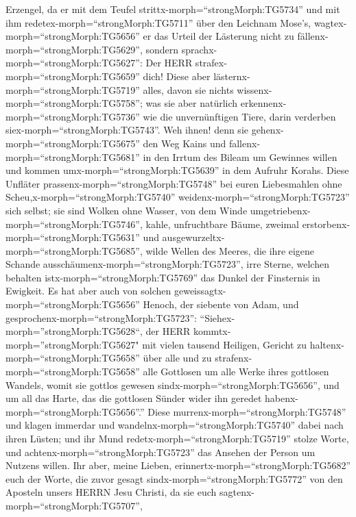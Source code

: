 Erzengel, da er mit dem Teufel strittx-morph=``strongMorph:TG5734'' und
mit ihm redetex-morph=``strongMorph:TG5711'' über den Leichnam Mose's,
wagtex-morph=``strongMorph:TG5656'' er das Urteil der Lästerung nicht zu
fällenx-morph=``strongMorph:TG5629'', sondern
sprachx-morph=``strongMorph:TG5627'': Der HERR
strafex-morph=``strongMorph:TG5659'' dich!  Diese aber
lästernx-morph=``strongMorph:TG5719'' alles, davon sie nichts
wissenx-morph=``strongMorph:TG5758''; was sie aber natürlich
erkennenx-morph=``strongMorph:TG5736'' wie die unvernünftigen Tiere,
darin verderben siex-morph=``strongMorph:TG5743''.  Weh
ihnen! denn sie gehenx-morph=``strongMorph:TG5675'' den Weg Kains und
fallenx-morph=``strongMorph:TG5681'' in den Irrtum des Bileam um
Gewinnes willen und kommen umx-morph=``strongMorph:TG5639'' in dem
Aufruhr Korahs.  Diese Unfläter
prassenx-morph=``strongMorph:TG5748'' bei euren Liebesmahlen ohne
Scheu,x-morph=``strongMorph:TG5740''
weidenx-morph=``strongMorph:TG5723'' sich selbst; sie sind Wolken ohne
Wasser, von dem Winde umgetriebenx-morph=``strongMorph:TG5746'', kahle,
unfruchtbare Bäume, zweimal erstorbenx-morph=``strongMorph:TG5631'' und
ausgewurzeltx-morph=``strongMorph:TG5685'',  wilde Wellen
des Meeres, die ihre eigene Schande
ausschäumenx-morph=``strongMorph:TG5723'', irre Sterne, welchen behalten
istx-morph=``strongMorph:TG5769'' das Dunkel der Finsternis in Ewigkeit.
 Es hat aber auch von solchen
geweissagtx-morph=``strongMorph:TG5656'' Henoch, der siebente von Adam,
und gesprochenx-morph=``strongMorph:TG5723'':
``Siehex-morph=''strongMorph:TG5628``, der HERR
kommtx-morph=''strongMorph:TG5627" mit vielen tausend Heiligen,
 Gericht zu haltenx-morph=``strongMorph:TG5658'' über alle
und zu strafenx-morph=``strongMorph:TG5658'' alle Gottlosen um alle
Werke ihres gottlosen Wandels, womit sie gottlos gewesen
sindx-morph=``strongMorph:TG5656'', und um all das Harte, das die
gottlosen Sünder wider ihn geredet
habenx-morph=``strongMorph:TG5656''.''  Diese
murrenx-morph=``strongMorph:TG5748'' und klagen immerdar und
wandelnx-morph=``strongMorph:TG5740'' dabei nach ihren Lüsten; und ihr
Mund redetx-morph=``strongMorph:TG5719'' stolze Worte, und
achtenx-morph=``strongMorph:TG5723'' das Ansehen der Person um Nutzens
willen.  Ihr aber, meine Lieben,
erinnertx-morph=``strongMorph:TG5682'' euch der Worte, die zuvor gesagt
sindx-morph=``strongMorph:TG5772'' von den Aposteln unsers HERRN Jesu
Christi,  da sie euch sagtenx-morph=``strongMorph:TG5707'',
